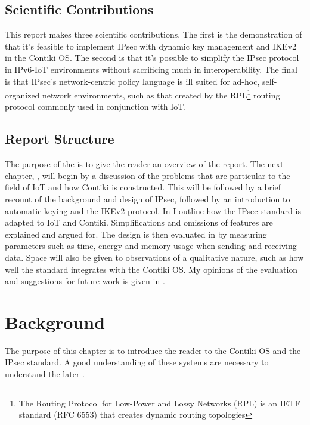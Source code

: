 \documentclass[final,a4paper,twoside,11pt,onecolumn]{report}
\begin{document}
\section{Scientific Contributions}
This report makes three scientific contributions. The first is the demonstration of that it's feasible to implement IPsec with dynamic key management and IKEv2 in the Contiki OS. The second is that it's possible to simplify the IPsec protocol in IPv6-IoT environments without sacrificing much in interoperability. The final is that IPsec's network-centric policy language is ill suited for ad-hoc, self-organized network environments, such as that created by the RPL\footnote{The Routing Protocol for Low-Power and Lossy Networks (RPL) is an IETF standard (RFC 6553) that creates dynamic routing topologies} routing protocol commonly used in conjunction with IoT.

\section{Report Structure}
The purpose of the  is to give the reader an overview of the report. The next chapter, , will begin by a discussion of the problems that are particular to the field of IoT and how Contiki is constructed. This will be followed by a brief recount of the background and design of IPsec, followed by an introduction to automatic keying and the IKEv2 protocol. In  I outline how the IPsec standard is adapted to IoT and Contiki. Simplifications and omissions of features are explained and argued for. The design is then evaluated in  by measuring parameters such as time, energy and memory usage when sending and receiving data. Space will also be given to observations of a qualitative nature, such as how well the standard integrates with the Contiki OS. My opinions of the evaluation and suggestions for future work is given in .


\chapter{Background}
\label{cha:bg}
The purpose of this chapter is to introduce the reader to the Contiki OS and the IPsec standard. A good understanding of these systems are necessary to understand the later .
\end{document}
